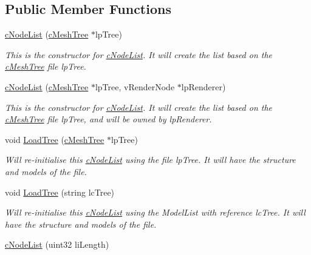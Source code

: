 \subsection*{Public Member Functions}
\begin{DoxyCompactItemize}
\item 
\hyperlink{classc_node_list_a122ac5ad7d8e84968cd4865234c71daf}{cNodeList} (\hyperlink{classc_mesh_tree}{cMeshTree} $\ast$lpTree)
\begin{DoxyCompactList}\small\item\em This is the constructor for \hyperlink{classc_node_list}{cNodeList}. It will create the list based on the \hyperlink{classc_mesh_tree}{cMeshTree} file lpTree. \end{DoxyCompactList}\item 
\hyperlink{classc_node_list_a7cb4e2a08630fa3e255e8d2fa57c9814}{cNodeList} (\hyperlink{classc_mesh_tree}{cMeshTree} $\ast$lpTree, vRenderNode $\ast$lpRenderer)
\begin{DoxyCompactList}\small\item\em This is the constructor for \hyperlink{classc_node_list}{cNodeList}. It will create the list based on the \hyperlink{classc_mesh_tree}{cMeshTree} file lpTree, and will be owned by lpRenderer. \end{DoxyCompactList}\item 
\hypertarget{classc_node_list_a4ea48f3d3f89f9c13bc5819e78fd1a56}{
void \hyperlink{classc_node_list_a4ea48f3d3f89f9c13bc5819e78fd1a56}{LoadTree} (\hyperlink{classc_mesh_tree}{cMeshTree} $\ast$lpTree)}
\label{classc_node_list_a4ea48f3d3f89f9c13bc5819e78fd1a56}

\begin{DoxyCompactList}\small\item\em Will re-\/initialise this \hyperlink{classc_node_list}{cNodeList} using the file lpTree. It will have the structure and models of the file. \end{DoxyCompactList}\item 
\hypertarget{classc_node_list_a1ab2143b5e9ff2fcede3ac0d172dfdf9}{
void \hyperlink{classc_node_list_a1ab2143b5e9ff2fcede3ac0d172dfdf9}{LoadTree} (string lcTree)}
\label{classc_node_list_a1ab2143b5e9ff2fcede3ac0d172dfdf9}

\begin{DoxyCompactList}\small\item\em Will re-\/initialise this \hyperlink{classc_node_list}{cNodeList} using the ModelList with reference lcTree. It will have the structure and models of the file. \end{DoxyCompactList}\item 
\hypertarget{classc_node_list_a90916d3103e324040fe9c8995d067174}{
\hyperlink{classc_node_list_a90916d3103e324040fe9c8995d067174}{cNodeList} (uint32 liLength)}
\label{classc_node_list_a90916d3103e324040fe9c8995d067174}


\end{DoxyCompactItemize}
